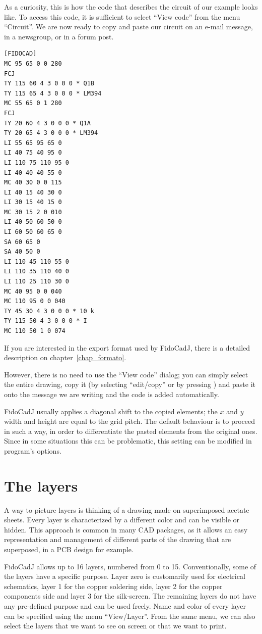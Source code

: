 \documentclass[10pt,a4paper,twoside]{scrreprt}
\newcommand{\keyevidence}[1]{\fbox{#1}}
\begin{document}
As a curiosity, this is how the code that describes
the circuit of our example looks like. To access this code, it is
sufficient to select ``View code'' from the menu ``Circuit''.
We are now ready to copy and paste our circuit on an e-mail message, in a newsgroup, or in a forum post.
\begin{lstlisting}
[FIDOCAD]
MC 95 65 0 0 280
FCJ
TY 115 60 4 3 0 0 0 * Q1B
TY 115 65 4 3 0 0 0 * LM394
MC 55 65 0 1 280
FCJ
TY 20 60 4 3 0 0 0 * Q1A
TY 20 65 4 3 0 0 0 * LM394
LI 55 65 95 65 0
LI 40 75 40 95 0
LI 110 75 110 95 0
LI 40 40 40 55 0
MC 40 30 0 0 115
LI 40 15 40 30 0
LI 30 15 40 15 0
MC 30 15 2 0 010
LI 40 50 60 50 0
LI 60 50 60 65 0
SA 60 65 0
SA 40 50 0
LI 110 45 110 55 0
LI 110 35 110 40 0
LI 110 25 110 30 0
MC 40 95 0 0 040
MC 110 95 0 0 040
TY 45 30 4 3 0 0 0 * 10 k
TY 115 50 4 3 0 0 0 * I
MC 110 50 1 0 074
\end{lstlisting}
If you are interested in the export format
used by FidoCadJ, there is a detailed description on chapter~\ref{chap_formato}.

However, there is no need to use the ``View code'' dialog;
you can simply select the entire drawing, copy it (by selecting ``edit/copy''
or by pressing \keyevidence{Ctrl+C}) and paste it onto the message
we are writing and the code is added automatically.

FidoCadJ usually applies a diagonal shift to the copied elements; the $x$ and $y$ width and height are equal to the grid pitch. The default behaviour is to proceed in such a way, in order to differentiate the pasted elements from the original ones. Since in some situations this can be problematic, this setting can be modified in program's options.

\section{The layers}
\label{sec_layer} A way to picture layers is thinking of a drawing made on superimposed acetate sheets. Every layer is characterized by a different color and can be visible or hidden. This approach is common in many CAD packages, as it allows an easy representation and management of different parts of the drawing that are superposed, in a PCB design for example.

FidoCadJ allows up to 16 layers, numbered from 0 to 15. Conventionally,
some of the layers have a specific purpose. Layer zero
is customarily used for electrical schematics, layer
1 for the copper soldering side, layer 2 for the
copper components side and layer 3 for the silk-screen.
The remaining layers do not have any pre-defined purpose and can be
used freely. Name and color of every layer can be
specified using the menu ``View/Layer''. From the same menu, we
can also select the layers that we want to see on screen or that we
want to print.
\end{document}
